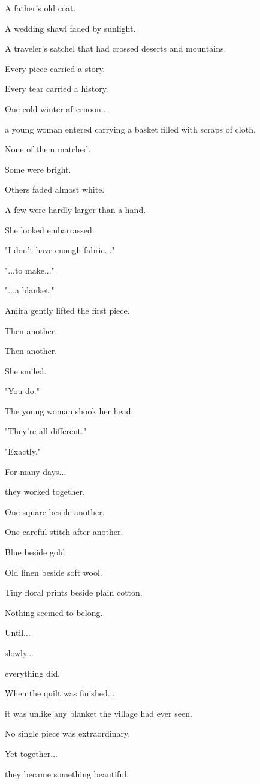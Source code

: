 \documentclass[12pt,openany]{book}
\begin{document}
A father's old coat.

A wedding shawl faded by sunlight.

A traveler's satchel that had crossed deserts and mountains.

Every piece carried a story.

Every tear carried a history.

One cold winter afternoon...

a young woman entered carrying a basket filled with scraps of cloth.

None of them matched.

Some were bright.

Others faded almost white.

A few were hardly larger than a hand.

She looked embarrassed.

"I don't have enough fabric..."

"...to make..."

"...a blanket."

Amira gently lifted the first piece.

Then another.

Then another.

She smiled.

"You do."

The young woman shook her head.

"They're all different."

"Exactly."

For many days...

they worked together.

One square beside another.

One careful stitch after another.

Blue beside gold.

Old linen beside soft wool.

Tiny floral prints beside plain cotton.

Nothing seemed to belong.

Until...

slowly...

everything did.

When the quilt was finished...

it was unlike any blanket the village had ever seen.

No single piece was extraordinary.

Yet together...

they became something beautiful.
\end{document}
